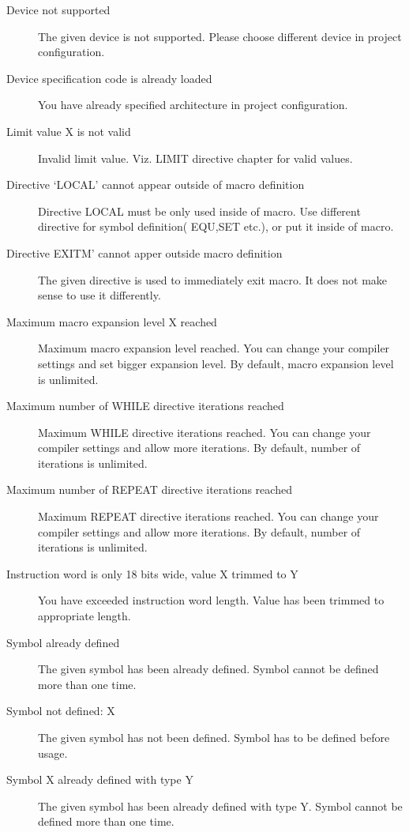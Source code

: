 \begin{description}
            \item[Device not supported]
                The given device is not supported. Please choose different device in project configuration.
            \item[Device specification code is already loaded ]
                You have already specified architecture in project configuration.
            \item[Limit value X is not valid]
                Invalid limit value. Viz. LIMIT directive chapter for valid values.
            \item[Directive `LOCAL' cannot appear outside of macro definition ]
                Directive LOCAL must be only used inside of macro. Use different directive for symbol definition( EQU,SET etc.), or put it inside of macro.
            \item[Directive EXITM' cannot apper outside macro definition]
                The given directive is used to immediately exit macro. It does not make sense to use it differently.
            \item[Maximum macro expansion level X reached  ]
                Maximum macro expansion level reached. You can change your compiler settings and set bigger expansion level. By default, macro expansion level is unlimited.
            \item[Maximum number of WHILE directive iterations reached ]
                Maximum WHILE directive iterations reached. You can change your compiler settings and allow more iterations. By default, number of iterations is unlimited.
            \item[Maximum number of REPEAT directive iterations reached ]
                Maximum REPEAT directive iterations reached. You can change your compiler settings and allow more iterations. By default, number of iterations is unlimited.
            \item[Instruction word is only 18 bits wide, value X trimmed to Y ]
                You have exceeded instruction word length. Value has been trimmed to  appropriate length.
            \item[Symbol already defined]
                The given symbol has been already defined. Symbol cannot be defined more than one time.
            \item[Symbol not defined: X ]
                The given symbol has not been defined. Symbol has to be defined before usage.
            \item[Symbol X already defined with type Y]
                The given symbol has been already defined with type Y. Symbol cannot be defined more than one time.

\end{description}
